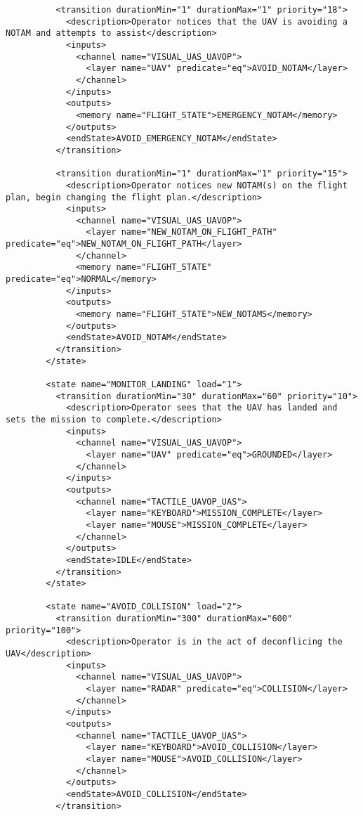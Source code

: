 \begin{verbatim}
          <transition durationMin="1" durationMax="1" priority="18">
            <description>Operator notices that the UAV is avoiding a NOTAM and attempts to assist</description>
            <inputs>
              <channel name="VISUAL_UAS_UAVOP">
                <layer name="UAV" predicate="eq">AVOID_NOTAM</layer>
              </channel>
            </inputs>
            <outputs>
              <memory name="FLIGHT_STATE">EMERGENCY_NOTAM</memory>           
            </outputs>
            <endState>AVOID_EMERGENCY_NOTAM</endState>
          </transition>
          
          <transition durationMin="1" durationMax="1" priority="15">
            <description>Operator notices new NOTAM(s) on the flight plan, begin changing the flight plan.</description>
            <inputs>
              <channel name="VISUAL_UAS_UAVOP">
                <layer name="NEW_NOTAM_ON_FLIGHT_PATH" predicate="eq">NEW_NOTAM_ON_FLIGHT_PATH</layer>
              </channel>
              <memory name="FLIGHT_STATE" predicate="eq">NORMAL</memory>
            </inputs>
            <outputs>
              <memory name="FLIGHT_STATE">NEW_NOTAMS</memory>
            </outputs>
            <endState>AVOID_NOTAM</endState>
          </transition>
        </state>
                                                           
        <state name="MONITOR_LANDING" load="1">
          <transition durationMin="30" durationMax="60" priority="10">
            <description>Operator sees that the UAV has landed and sets the mission to complete.</description>
            <inputs>
              <channel name="VISUAL_UAS_UAVOP">
                <layer name="UAV" predicate="eq">GROUNDED</layer>
              </channel>
            </inputs>
            <outputs>
              <channel name="TACTILE_UAVOP_UAS">
                <layer name="KEYBOARD">MISSION_COMPLETE</layer>
                <layer name="MOUSE">MISSION_COMPLETE</layer>
              </channel>
            </outputs>
            <endState>IDLE</endState>
          </transition>
        </state>
        
        <state name="AVOID_COLLISION" load="2">
          <transition durationMin="300" durationMax="600" priority="100">
            <description>Operator is in the act of deconflicing the UAV</description>
            <inputs>
              <channel name="VISUAL_UAS_UAVOP">
                <layer name="RADAR" predicate="eq">COLLISION</layer>
              </channel>
            </inputs>
            <outputs>
              <channel name="TACTILE_UAVOP_UAS">
                <layer name="KEYBOARD">AVOID_COLLISION</layer>
                <layer name="MOUSE">AVOID_COLLISION</layer>
              </channel>
            </outputs>
            <endState>AVOID_COLLISION</endState>
          </transition>
          

\end{verbatim}
